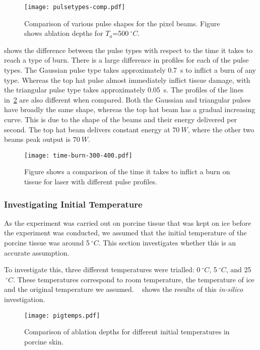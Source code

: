\begin{figure}[!htbp]
	\centering
	\texttt{[image: pulsetypes-comp.pdf]}
	\caption{Comparison of various pulse shapes for the pixel beams. Figure shows ablation depths for $T_a$=500$~^{\circ}C$.}
	\label{fig:comparepulsetypes}
\end{figure}

 shows the difference between the pulse types with respect to the time it takes to reach a type of burn.
There is a large difference in profiles for each of the pulse types.
The Gaussian pulse type takes approximately 0.7~s to inflict a burn of any type.
Whereas the top hat pulse almost immediately inflict tissue damage, with the triangular pulse type takes approximately 0.05~s.
The profiles of the lines in~\cref{fig:pulsetypeburn} are also different when compared.
Both the Gaussian and triangular pulses have broadly the same shape, whereas the top hat beam has a gradual increasing curve.
This is due to the shape of the beams and their energy delivered per second.
The top hat beam delivers constant energy at $70~W$, where the other two beams peak output is $70~W$.

\begin{figure}[!htbp]
	\centering
	\texttt{[image: time-burn-300-400.pdf]}
	\caption{Figure shows a comparison of the time it takes to inflict a burn on tissue for laser with different pulse profiles.}
	\label{fig:pulsetypeburn}
\end{figure}
\FloatBarrier
\subsubsection*{Investigating Initial Temperature}

As the experiment was carried out on porcine tissue that was kept on ice before the experiment was conducted, we assumed that the initial temperature of the porcine tissue was around 5$~^{\circ}C$.
This section investigates whether this is an accurate assumption.

To investigate this, three different temperatures were trialled: 0$~^{\circ}C$, 5$~^{\circ}C$, and 25$~^{\circ}C$.
These temperatures correspond to room temperature, the temperature of ice and the original temperature we assumed.
~ shows the results of this \textit{in-silico} investigation.


\begin{figure}[!htbp]
	\centering
	\texttt{[image: pigtemps.pdf]}
	\caption{Comparison of ablation depths for different initial temperatures in porcine skin.}
	\label{fig:pigtempcomp}
\end{figure}

